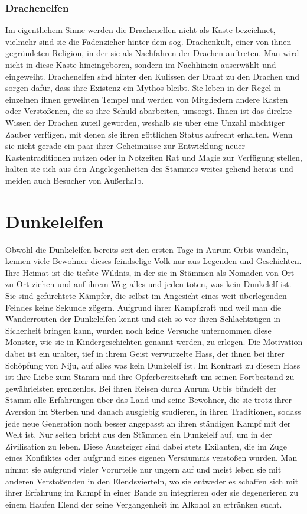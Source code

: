 \documentclass[a4paper,12pt,oneside]{book}
\begin{document}
\subsubsection{Drachenelfen}
Im eigentlichem Sinne werden die Drachenelfen nicht als Kaste bezeichnet, vielmehr sind sie die Fadenzieher hinter dem sog. Drachenkult, einer von ihnen gegründeten Religion, in der sie als Nachfahren der Drachen auftreten. Man wird nicht in diese Kaste hineingeboren, sondern im Nachhinein auserwählt und eingeweiht. Drachenelfen sind hinter den Kulissen der Draht zu den Drachen und sorgen dafür, dass ihre Existenz ein Mythos bleibt. Sie leben in der Regel in einzelnen ihnen geweihten Tempel und werden von Mitgliedern andere Kasten oder Verstoßenen, die so ihre Schuld abarbeiten, umsorgt. Ihnen ist das direkte Wissen der Drachen zuteil geworden, weshalb sie über eine Unzahl mächtiger Zauber verfügen, mit denen sie ihren göttlichen Status aufrecht erhalten. Wenn sie nicht gerade ein paar ihrer Geheimnisse zur Entwicklung neuer Kastentraditionen nutzen oder in Notzeiten Rat und Magie zur Verfügung stellen, halten sie sich aus den Angelegenheiten des Stammes weites gehend heraus und meiden auch Besucher von Außerhalb.

\section{Dunkelelfen}\label{Dunkelelf}
Obwohl die Dunkelelfen bereits seit den ersten Tage in Aurum Orbis wandeln, kennen viele Bewohner dieses feindselige Volk nur aus Legenden und Geschichten. Ihre Heimat ist die tiefste Wildnis, in der sie in Stämmen als Nomaden von Ort zu Ort ziehen und auf ihrem Weg alles und jeden töten, was kein Dunkelelf ist. Sie sind gefürchtete Kämpfer, die selbst im Angesicht eines weit überlegenden Feindes keine Sekunde zögern. Aufgrund ihrer Kampfkraft und weil man die Wanderrouten der Dunkelelfen kennt und sich so vor ihren Schlachtzügen in Sicherheit bringen kann, wurden noch keine Versuche unternommen diese Monster, wie sie in Kindergeschichten genannt werden, zu erlegen. Die Motivation dabei ist ein uralter, tief in ihrem Geist verwurzelte Hass, der ihnen bei ihrer Schöpfung von Niju, auf alles was kein Dunkelelf ist. Im Kontrast zu diesem Hass ist ihre Liebe zum Stamm und ihre Opferbereitschaft um seinen Fortbestand zu gewährleisten grenzenlos. Bei ihren Reisen durch Aurum Orbis bündelt der Stamm alle Erfahrungen über das Land und seine Bewohner, die sie trotz ihrer Aversion im Sterben und danach ausgiebig studieren, in ihren Traditionen, sodass jede neue Generation noch besser angepasst an ihren ständigen Kampf mit der Welt ist. Nur selten bricht aus den Stämmen ein Dunkelelf auf, um in der Zivilisation zu leben. Diese Aussteiger sind dabei stets Exilanten, die im Zuge eines Konfliktes oder aufgrund eines eigenen Versäumnis verstoßen wurden. Man nimmt sie aufgrund vieler Vorurteile nur ungern auf und meist leben sie mit anderen Verstoßenden in den Elendsvierteln, wo sie entweder es schaffen sich mit ihrer Erfahrung im Kampf in einer Bande zu integrieren oder sie degenerieren zu einem Haufen Elend der seine Vergangenheit im Alkohol zu ertränken sucht.
\end{document}
